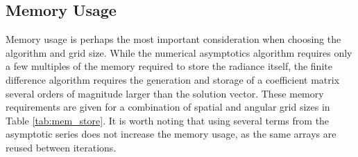 \documentclass[ms,cpyr,lof,lot]{uathesis}
\begin{document}

\subsection{Memory Usage}
Memory usage is perhaps the most important consideration when choosing the algorithm and grid size.
While the numerical asymptotics algorithm requires only a few multiples of the memory required to store the radiance itself, the finite difference algorithm requires the generation and storage of a coefficient matrix several orders of magnitude larger than the solution vector.
These memory requirements are given for a combination of spatial and angular grid sizes in Table \ref{tab:mem_store}.
It is worth noting that using several terms from the asymptotic series does not increase the memory usage, as the same arrays are reused between iterations.
\end{document}
